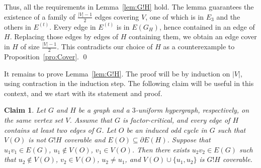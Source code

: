 \documentclass[10pt,a4paper]{amsart}
\newtheorem{claim}[theorem]{Claim}
\begin{document}
Thus, all the requirements in Lemma~\ref{lem:G!H} hold. The lemma guarantees the existence of a family of $\frac{|V|-1}{2}$ edges covering $V$, one of which is in $E_3$ and the others in $E^{(t)}$. Every edge in $E^{(t)}$ is in $E(G_H)$, hence contained in an edge of $H$. Replacing those edges by edges of $H$ containing them, we obtain an edge cover in $H$ of size $\frac{|V|-1}{2}$. This contradicts our choice of $H$ as a counterexample to Proposition~\ref{pro:Cover}. \qed

\vspace{10pt}

It remains to prove Lemma~\ref{lem:G!H}. The proof will be by induction on $|V|$, using contraction in the induction step. The following claim will be useful in this context, and we start with its statement and proof.
\begin{claim} \label{cl:Out}
Let $G$ and $H$ be a graph and a $3$-uniform hypergraph, respectively, on the same vertex set $V$. Assume that $G$ is factor-critical, and every edge of $H$ contains at least two edges of $G$. Let $O$ be an induced odd cycle in $G$ such that $V(O)$ is not $G!H$ coverable and $E(O) \subseteq \partial E(H)$. Suppose that $u_1v_1 \in E(G)$, $u_1 \notin V(O)$, $v_1 \in V(O)$. Then there exists $u_2v_2 \in E(G)$ such that $u_2 \notin V(O)$, $v_2 \in V(O)$, $u_2 \ne u_1$, and $V(O) \cup \{u_1,u_2\}$ is $G!H$ coverable.
\end{claim}
\end{document}
